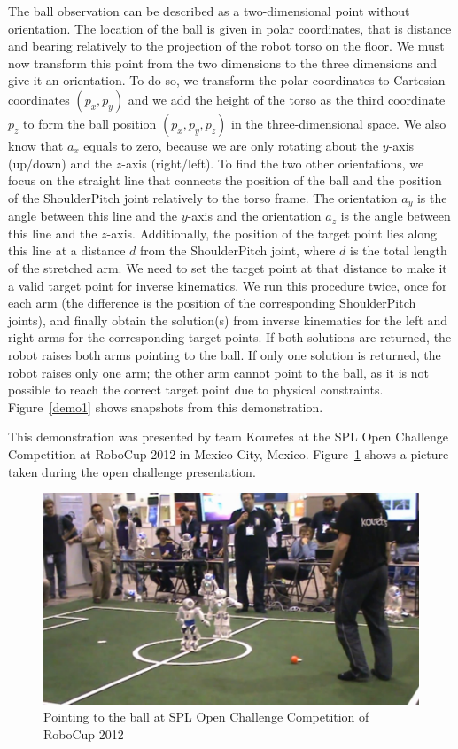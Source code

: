 The ball observation can be described as a two-dimensional point without orientation. The location of the ball is given in polar coordinates, that is distance and bearing relatively to the projection of the robot torso on the floor. We must now transform this point from the two dimensions to the three dimensions and give it an orientation. To do so, we transform the polar coordinates to Cartesian coordinates $(p_x,p_y)$ and we add the height of the torso as the third coordinate $p_z$ to form the ball position $(p_x,p_y,p_z)$ in the three-dimensional space.  We also know that $a_x$ equals to zero, because we are only rotating about the $y$-axis (up/down) and the $z$-axis (right/left). To find the two other orientations, we focus on the straight line that connects the position of the ball and the position of the ShoulderPitch joint relatively to the torso frame. The orientation $a_y$ is the angle between this line and the $y$-axis and the orientation $a_z$ is the angle between this line and the $z$-axis. Additionally, the position of the target point lies along this line at a distance $d$ from the ShoulderPitch joint, where $d$ is the total length of the stretched arm. We need to set the target point at that distance to make it a valid target point for inverse kinematics. We run this procedure twice, once for each arm (the difference is the position of the corresponding ShoulderPitch joints), and finally obtain the solution(s) from inverse kinematics for the left and right arms for the corresponding target points. If both solutions are returned, the robot raises both arms pointing to the ball. If only one solution is returned, the robot raises only one arm; the other arm cannot point to the ball, as it is not possible to reach the correct target point due to physical constraints. Figure~\ref{demo1} shows snapshots from this demonstration.

This demonstration was presented by team Kouretes at the SPL Open Challenge Competition at RoboCup 2012 in Mexico City, Mexico. Figure~\ref{fig:open} shows a picture taken during the open challenge presentation. 

\begin{figure}[!t]
\centerline{
\includegraphics[width=.8\textwidth]{Figures/openchallenge2012.png}
}
\caption{Pointing to the ball at SPL Open Challenge Competition of RoboCup 2012}
\label{fig:open}
\end{figure}



